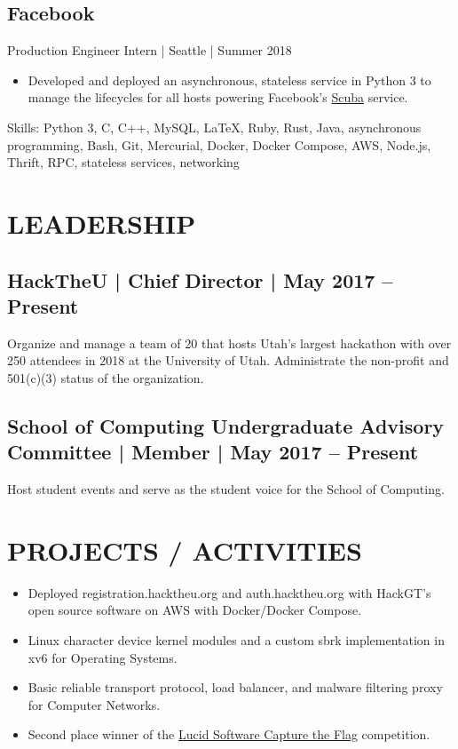 \documentclass[10pt, letterpaper]{resume}
\begin{document}
\subsection{Facebook}
Production Engineer Intern | Seattle | Summer 2018
\begin{itemize}
  \item Developed and deployed an asynchronous, stateless service in Python 3 to manage the lifecycles for all hosts powering Facebook's \href{https://research.fb.com/wp-content/uploads/2016/11/scuba-diving-into-data-at-facebook.pdf}{Scuba} service.
\end{itemize}

{\selectfont Skills:} Python 3, C, C++, MySQL, \LaTeX, Ruby, Rust, Java, asynchronous programming, Bash, Git, Mercurial, Docker, Docker Compose, AWS, Node.js, Thrift, RPC, stateless services, networking

\section{LEADERSHIP}
\subsection{HackTheU {\normalfont | Chief Director | May 2017 -- Present}}
Organize and manage a team of 20 that hosts Utah’s largest hackathon with over 250 attendees in 2018 at the University of Utah. Administrate the non-profit and 501(c)(3) status of the organization.

\subsection{School of Computing Undergraduate Advisory Committee {\normalfont |  Member | May 2017 -- Present}}
Host student events and serve as the student voice for the School of Computing.

\section{PROJECTS / ACTIVITIES}
\begin{itemize}
  \item Deployed registration.hacktheu.org and auth.hacktheu.org with HackGT's open source software on AWS with Docker/Docker Compose.
  \item Linux character device kernel modules and a custom sbrk implementation in xv6 for Operating Systems.
  \item Basic reliable transport protocol, load balancer, and malware filtering proxy for Computer Networks.
  \item Second place winner of the \href{https://github.com/lucidsoftware/ctf2019}{Lucid Software Capture the Flag} competition.
\end{itemize}
\end{document}
